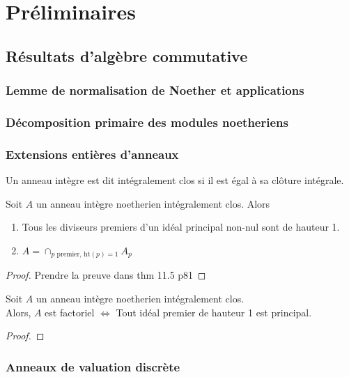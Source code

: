 \chapter{Préliminaires}

\section{Résultats d'algèbre commutative}

\subsection{Lemme de normalisation de Noether et applications}
\subsection{Décomposition primaire des modules noetheriens}

\subsection{Extensions entières d'anneaux}

\begin{defn}
Un anneau intègre est dit intégralement clos si il est égal à sa clôture intégrale.
\end{defn}

\begin{thm}\label{factonormal}
Soit $A$ un anneau intègre noetherien intégralement clos. Alors
\begin{enumerate}
\item Tous les diviseurs premiers d'un idéal principal non-nul sont de hauteur 1.
\item $A=\cap_{p \textrm{ premier, } \textrm{ht}(p)=1} A_p$
\end{enumerate}
\end{thm}
\begin{proof}
Prendre la preuve dans \cite{Matsumura} thm 11.5 p81
\end{proof}


\begin{thm}\label{UFDPID}
Soit $A$ un anneau intègre noetherien intégralement clos. \\
Alors, $A$ est factoriel $\iff$ Tout idéal premier de hauteur 1 est principal.
\end{thm}
\begin{proof}
\end{proof}

\subsection{Anneaux de valuation discrète}


